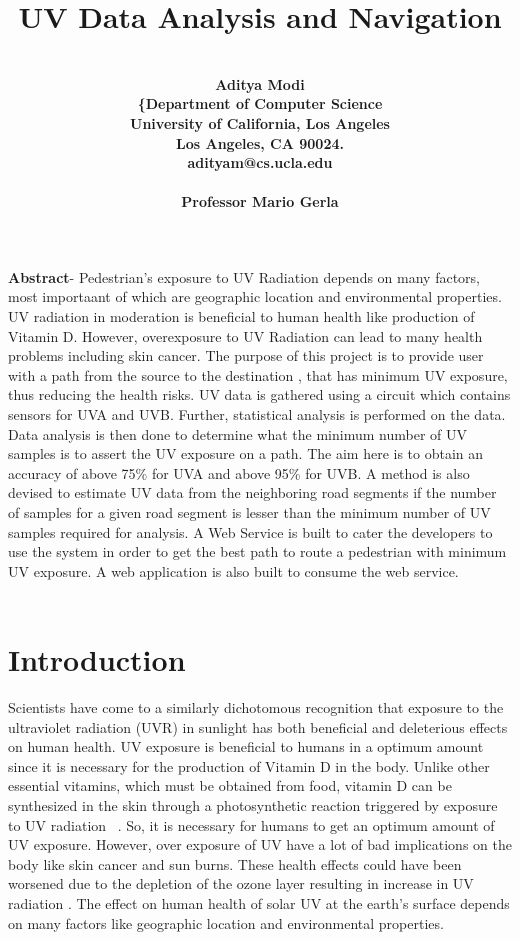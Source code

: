 \documentclass[12pt,fullpage,doublespace]{article}
\begin{document}
\title{\textbf{UV Data Analysis and Navigation}}
\author{\\\bf {Aditya Modi}\\
\{Department of Computer Science\\
University of California, Los Angeles \\
Los Angeles, CA 90024. \\
adityam@cs.ucla.edu\\
\mbox{}\\
Professor Mario Gerla}


\date{}
\maketitle


\textbf{\normalsize Abstract}- {Pedestrian’s exposure to UV Radiation depends on many factors, most importaant of which are geographic location and environmental properties. UV radiation in moderation is beneficial to human health like production of Vitamin D. However, overexposure to UV Radiation can lead to many health problems including skin cancer. The purpose of this project is to provide user with a path from the source to the destination , that has minimum UV exposure, thus reducing the health risks. UV data is gathered using a circuit which contains sensors for UVA and UVB. Further, statistical analysis is performed on the data. Data analysis is then done to determine what the minimum number of UV samples is to assert the UV exposure on a path. The aim here is to obtain an accuracy of above 75\% for UVA and above 95\% for UVB. A method is also devised to estimate UV data from the neighboring road segments if the number of samples for a given road segment is lesser than the minimum number of UV samples required for analysis. A Web Service is built to cater the developers to use the system in order to get the best path to route a pedestrian with minimum UV exposure. A web application is also built to consume the web service.}\\\\
\newpage

\section{Introduction}
Scientists have come to a similarly dichotomous recognition that exposure to the ultraviolet radiation (UVR) in sunlight has both beneficial and deleterious effects on human health. UV exposure is beneficial to humans in a optimum amount since it is necessary for the production of Vitamin D in the body. Unlike other essential vitamins, which must be obtained from food, vitamin D can be synthesized in the skin through a photosynthetic reaction triggered by exposure to UV radiation ~\cite{dep1}. So, it is necessary for humans to get an optimum amount of UV exposure. However, over exposure of UV have a lot of bad implications on the body like skin cancer and sun burns. These health effects could have been worsened due to the depletion of the ozone layer resulting in increase in UV radiation \cite{dep2}. The effect on human health of solar UV at the earth’s surface depends on many factors like geographic location and environmental properties.  
\end{document}
